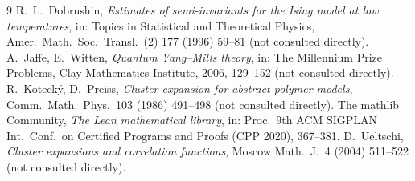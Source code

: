 \documentclass[11pt,a4paper]{article}
\theoremstyle{definition}
\theoremstyle{remark}
\begin{document}
\begin{thebibliography}{9}
 R.~L.~Dobrushin, \emph{Estimates of semi-invariants for the Ising model at low temperatures}, in: Topics in Statistical and Theoretical Physics, Amer.\ Math.\ Soc.\ Transl.\ (2) 177 (1996) 59--81 (not consulted directly).
 A.~Jaffe, E.~Witten, \emph{Quantum Yang--Mills theory}, in: The Millennium Prize Problems, Clay Mathematics Institute, 2006, 129--152 (not consulted directly).
 R.~Kotecký, D.~Preiss, \emph{Cluster expansion for abstract polymer models}, Comm.\ Math.\ Phys.\ 103 (1986) 491--498 (not consulted directly).
 The mathlib Community, \emph{The Lean mathematical library}, in: Proc.\ 9th ACM SIGPLAN Int.\ Conf.\ on Certified Programs and Proofs (CPP 2020), 367--381.
 D.~Ueltschi, \emph{Cluster expansions and correlation functions}, Moscow Math.\ J.\ 4 (2004) 511--522 (not consulted directly).
\end{thebibliography}
\end{document}
